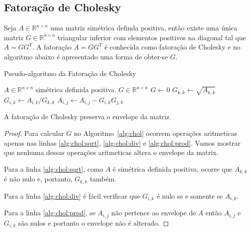 \subsection{Fatoração de Cholesky}
Seja $A \in \mathbb{R}^{n \times n}$ uma matriz simétrica definda positiva, então existe
uma única matriz $G \in \mathbb{R}^{n \times n}$ triangular inferior com
elementos positivos na diagonal tal que $A = G G^T$. A fatoração $A = G G^T$ é
conhecida como fatoração de Cholesky e no algoritmo abaixo é apresentado
uma forma de obter-se $G$.
\begin{algorithm}[H]
    \caption{Pseudo-algoritmo da Fatoração de Cholesky}
    \label{alg:chol}
    \begin{algorithmic}[1]
        \REQUIRE $A \in \mathbb{R}^{n \times n}$ simétrica definida positiva.
        \ENSURE $G \in \mathbb{R}^{n \times n}$
        \STATE $G \longleftarrow 0$ 
            \STATE $G_{k,k} \longleftarrow \sqrt{A_{k,k}}$ \label{alg:chol:sqrt}
                \STATE $G_{i,k} \longleftarrow A_{i,k} / G_{k,k}$
                \label{alg:chol:div}
            \ENDFOR
                    \STATE $A_{i,j} \longleftarrow A_{i,j} - G_{i,k} G_{j,k}$
                    \label{alg:chol:prod}
                \ENDFOR
            \ENDFOR
        \ENDFOR
    \end{algorithmic}
\end{algorithm}

\begin{prop}
    \label{prop:pres:env}
    A fatoração de Cholesky preserva o envelope da matriz.
\end{prop}
\begin{proof}
    Para calcular $G$ no Algoritmo~\ref{alg:chol} ocorrem operações aritmeticas
    apenas nas linhas \ref{alg:chol:sqrt}, \ref{alg:chol:div} e
    \ref{alg:chol:prod}. Vamos mostrar que nenhuma dessas operações aritmeticas
    altera o envelope da matrix.

    Para a linha \ref{alg:chol:sqrt}, como $A$ é simétrica definida positiva,
    ocorre que $A_{k,k}$ é não nulo e, portanto, $G_{k,k}$ também.

    Para a linha \ref{alg:chol:div} é fácil verificar que $G_{i,k}$ é nulo se e
    somente se $A_{i,k}$.

    Para a linha \ref{alg:chol:prod}, se $A_{i,j}$ não pertence ao envelope de $A$
    então $A_{i,j}$ e $G_{i,k}$ são nulos e portanto o envelope não é alterado.
\end{proof}

